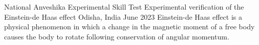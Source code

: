 \begin{cventries}
\cventry
{National Anveshika Experimental Skill Test} %
{Experimental verification of the Einstein-de Haas effect } %
{Odisha, India} %
{June 2023} %
{
	 Einstein-de Haas effect is a physical phenomenon in which a change in the magnetic moment of a free body causes the body to rotate following conservation of angular momentum.
}
%

\end{cventries}
